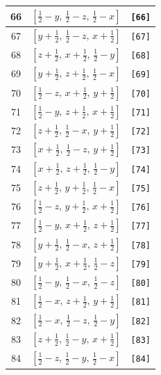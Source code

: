 \documentclass[fleqn,8pt]{jsarticle}
\begin{document}
\begin{longtable}{ccc}
66 & $\left[ \frac{1}{2} - y,\, \frac{1}{2} - z,\, \frac{1}{2} - x \right]$ & {\tt [66]} \\ \hline
67 & $\left[ y + \frac{1}{2},\, \frac{1}{2} - z,\, x + \frac{1}{2} \right]$ & {\tt [67]} \\ \hline
68 & $\left[ z + \frac{1}{2},\, x + \frac{1}{2},\, \frac{1}{2} - y \right]$ & {\tt [68]} \\ \hline
69 & $\left[ y + \frac{1}{2},\, z + \frac{1}{2},\, \frac{1}{2} - x \right]$ & {\tt [69]} \\ \hline
70 & $\left[ \frac{1}{2} - z,\, x + \frac{1}{2},\, y + \frac{1}{2} \right]$ & {\tt [70]} \\ \hline
71 & $\left[ \frac{1}{2} - y,\, z + \frac{1}{2},\, x + \frac{1}{2} \right]$ & {\tt [71]} \\ \hline
72 & $\left[ z + \frac{1}{2},\, \frac{1}{2} - x,\, y + \frac{1}{2} \right]$ & {\tt [72]} \\ \hline
73 & $\left[ x + \frac{1}{2},\, \frac{1}{2} - z,\, y + \frac{1}{2} \right]$ & {\tt [73]} \\ \hline
74 & $\left[ x + \frac{1}{2},\, z + \frac{1}{2},\, \frac{1}{2} - y \right]$ & {\tt [74]} \\ \hline
75 & $\left[ z + \frac{1}{2},\, y + \frac{1}{2},\, \frac{1}{2} - x \right]$ & {\tt [75]} \\ \hline
76 & $\left[ \frac{1}{2} - z,\, y + \frac{1}{2},\, x + \frac{1}{2} \right]$ & {\tt [76]} \\ \hline
77 & $\left[ \frac{1}{2} - y,\, x + \frac{1}{2},\, z + \frac{1}{2} \right]$ & {\tt [77]} \\ \hline
78 & $\left[ y + \frac{1}{2},\, \frac{1}{2} - x,\, z + \frac{1}{2} \right]$ & {\tt [78]} \\ \hline
79 & $\left[ y + \frac{1}{2},\, x + \frac{1}{2},\, \frac{1}{2} - z \right]$ & {\tt [79]} \\ \hline
80 & $\left[ \frac{1}{2} - y,\, \frac{1}{2} - x,\, \frac{1}{2} - z \right]$ & {\tt [80]} \\ \hline
81 & $\left[ \frac{1}{2} - x,\, z + \frac{1}{2},\, y + \frac{1}{2} \right]$ & {\tt [81]} \\ \hline
82 & $\left[ \frac{1}{2} - x,\, \frac{1}{2} - z,\, \frac{1}{2} - y \right]$ & {\tt [82]} \\ \hline
83 & $\left[ z + \frac{1}{2},\, \frac{1}{2} - y,\, x + \frac{1}{2} \right]$ & {\tt [83]} \\ \hline
84 & $\left[ \frac{1}{2} - z,\, \frac{1}{2} - y,\, \frac{1}{2} - x \right]$ & {\tt [84]} \\ \hline

\end{longtable}
\end{document}
